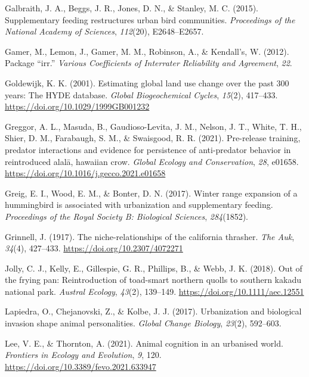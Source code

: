 \documentclass[
]{article}
\newlength{\cslhangindent}
\newenvironment{CSLReferences}[2] %
 {\begin{list}{}{%
  \setlength{\itemindent}{0pt}
  \setlength{\leftmargin}{0pt}
  \setlength{\parsep}{0pt}
  \ifodd #1
   \setlength{\leftmargin}{\cslhangindent}
   \setlength{\itemindent}{-1\cslhangindent}
  \fi
  \setlength{\itemsep}{#2\baselineskip}}}
 {\end{list}}
\begin{document}
\begin{CSLReferences}{1}{0}
Galbraith, J. A., Beggs, J. R., Jones, D. N., \& Stanley, M. C. (2015).
Supplementary feeding restructures urban bird communities.
\emph{Proceedings of the National Academy of Sciences}, \emph{112}(20),
E2648--E2657.

Gamer, M., Lemon, J., Gamer, M. M., Robinson, A., \& Kendall's, W.
(2012). Package {``irr.''} \emph{Various Coefficients of Interrater
Reliability and Agreement}, \emph{22}.

Goldewijk, K. K. (2001). Estimating global land use change over the past
300 years: The HYDE database. \emph{Global Biogeochemical Cycles},
\emph{15}(2), 417--433. \url{https://doi.org/10.1029/1999GB001232}

Greggor, A. L., Masuda, B., Gaudioso-Levita, J. M., Nelson, J. T.,
White, T. H., Shier, D. M., Farabaugh, S. M., \& Swaisgood, R. R.
(2021). Pre-release training, predator interactions and evidence for
persistence of anti-predator behavior in reintroduced alal{ā}, hawaiian
crow. \emph{Global Ecology and Conservation}, \emph{28}, e01658.
\url{https://doi.org/10.1016/j.gecco.2021.e01658}

Greig, E. I., Wood, E. M., \& Bonter, D. N. (2017). Winter range
expansion of a hummingbird is associated with urbanization and
supplementary feeding. \emph{Proceedings of the Royal Society B:
Biological Sciences}, \emph{284}(1852).

Grinnell, J. (1917). The niche-relationships of the california thrasher.
\emph{The Auk}, \emph{34}(4), 427--433.
\url{https://doi.org/10.2307/4072271}

Jolly, C. J., Kelly, E., Gillespie, G. R., Phillips, B., \& Webb, J. K.
(2018). Out of the frying pan: Reintroduction of toad-smart northern
quolls to southern kakadu national park. \emph{Austral Ecology},
\emph{43}(2), 139--149. \url{https://doi.org/10.1111/aec.12551}

Lapiedra, O., Chejanovski, Z., \& Kolbe, J. J. (2017). Urbanization and
biological invasion shape animal personalities. \emph{Global Change
Biology}, \emph{23}(2), 592--603.

Lee, V. E., \& Thornton, A. (2021). Animal cognition in an urbanised
world. \emph{Frontiers in Ecology and Evolution}, \emph{9}, 120.
\url{https://doi.org/10.3389/fevo.2021.633947}


\end{CSLReferences}
\end{document}
